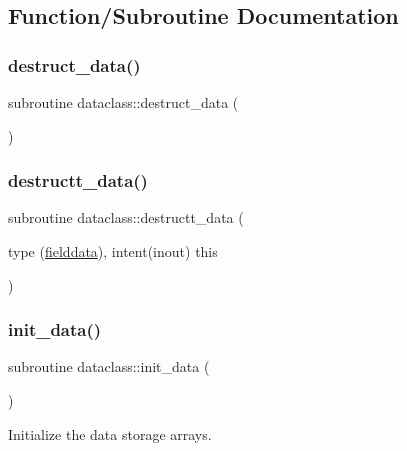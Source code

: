 \subsection{Function/\+Subroutine Documentation}
\mbox{\label{namespacedataclass_ac5b255034c2a115b6740378b4d1e630e}} 
\subsubsection{\texorpdfstring{destruct\_data()}{destruct\_data()}}
{\footnotesize\ttfamily subroutine dataclass\+::destruct\+\_\+data (\begin{DoxyParamCaption}{ }\end{DoxyParamCaption})}

\mbox{\label{namespacedataclass_aa6d6d0d2beefc01e5873047a3c78f073}} 
\subsubsection{\texorpdfstring{destructt\_data()}{destructt\_data()}}
{\footnotesize\ttfamily subroutine dataclass\+::destructt\+\_\+data (\begin{DoxyParamCaption}\item[{type (\mbox{\hyperlink{namespacedataclass_structdataclass_1_1fielddata}{fielddata}}), intent(inout)}]{this }\end{DoxyParamCaption})}

\mbox{\label{namespacedataclass_a474ffe5e76484d63015aaf6255c27294}} 
\subsubsection{\texorpdfstring{init\_data()}{init\_data()}}
{\footnotesize\ttfamily subroutine dataclass\+::init\+\_\+data (\begin{DoxyParamCaption}{ }\end{DoxyParamCaption})}



Initialize the data storage arrays. 

